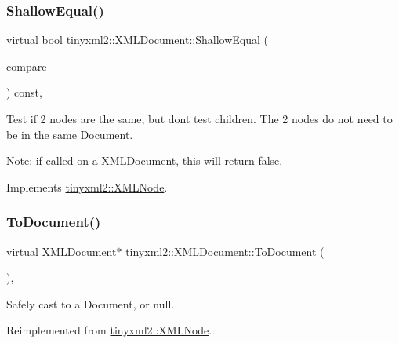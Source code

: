 \subsubsection{\texorpdfstring{Shallow\+Equal()}{ShallowEqual()}}
{\footnotesize\ttfamily virtual bool tinyxml2\+::\+X\+M\+L\+Document\+::\+Shallow\+Equal (\begin{DoxyParamCaption}\item[{const \mbox{\hyperlink{classtinyxml2_1_1_x_m_l_node}{X\+M\+L\+Node}} $\ast$}]{compare }\end{DoxyParamCaption}) const\hspace{0.3cm}{\ttfamily [inline]}, {\ttfamily [virtual]}}

Test if 2 nodes are the same, but don\textquotesingle{}t test children. The 2 nodes do not need to be in the same Document.

Note\+: if called on a \mbox{\hyperlink{classtinyxml2_1_1_x_m_l_document}{X\+M\+L\+Document}}, this will return false. 

Implements \mbox{\hyperlink{classtinyxml2_1_1_x_m_l_node_a7ce18b751c3ea09eac292dca264f9226}{tinyxml2\+::\+X\+M\+L\+Node}}.

\mbox{\label{classtinyxml2_1_1_x_m_l_document_a3e185f880882bd978367bb55937735ec}} 
\subsubsection{\texorpdfstring{To\+Document()}{ToDocument()}\hspace{0.1cm}{\footnotesize\ttfamily [1/2]}}
{\footnotesize\ttfamily virtual \mbox{\hyperlink{classtinyxml2_1_1_x_m_l_document}{X\+M\+L\+Document}}$\ast$ tinyxml2\+::\+X\+M\+L\+Document\+::\+To\+Document (\begin{DoxyParamCaption}{ }\end{DoxyParamCaption})\hspace{0.3cm}{\ttfamily [inline]}, {\ttfamily [virtual]}}



Safely cast to a Document, or null. 



Reimplemented from \mbox{\hyperlink{classtinyxml2_1_1_x_m_l_node_a836e2966ed736fc3c94f70e12a2a3357}{tinyxml2\+::\+X\+M\+L\+Node}}.

